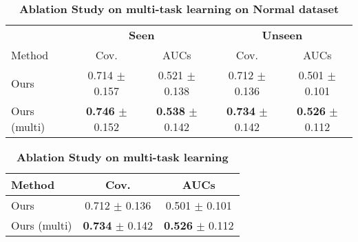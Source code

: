 \begin{table}[htbp]
\centering
\begin{tabular}{lcc|cc}
\toprule
& \multicolumn{2}{c|}{\textbf{Seen}} & \multicolumn{2}{c}{\textbf{Unseen}} \\
\multirow{-2}{*}{Method} & Cov. & AUCs & Cov. & AUCs \\
\midrule
Ours & 0.714 $\pm$ 0.157 & 0.521 $\pm$ 0.138 & 0.712 $\pm$ 0.136 & 0.501 $\pm$ 0.101 \\
Ours (multi) & \textbf{0.746} $\pm$ 0.152 & \textbf{0.538} $\pm$ 0.142 & \textbf{0.734} $\pm$ 0.142 & \textbf{0.526} $\pm$ 0.112 \\
\bottomrule
\end{tabular}
\caption{\textbf{Ablation Study on multi-task learning on Normal dataset}}
\label{tab:ablation_multi_full}
\end{table}

\begin{table}[htbp]
\centering
\begin{tabular}{lcc}
\toprule
Method & Cov. & AUCs \\
\midrule
Ours & 0.712 $\pm$ 0.136 & 0.501 $\pm$ 0.101 \\
Ours (multi) & \textbf{0.734} $\pm$ 0.142 & \textbf{0.526} $\pm$ 0.112 \\
\bottomrule
\end{tabular}
\caption{\textbf{Ablation Study on multi-task learning}}
\label{tab:ablation_multi_unseen}
\end{table}